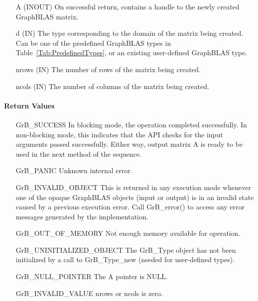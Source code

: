 \begin{itemize}[leftmargin=1.1in]
    \item[{\sf A}] ({\sf INOUT}) On successful return, contains a handle to 
                                 the newly created GraphBLAS matrix.
    \item[{\sf d}] ({\sf IN})    The type corresponding to the domain of the matrix 
                                 being created. Can be one of the predefined
                                 GraphBLAS types in Table~\ref{Tab:PredefinedTypes}, 
                                 or an existing user-defined GraphBLAS type.
    \item[{\sf nrows}] ({\sf IN}) The number of rows of the matrix being created.
    \item[{\sf ncols}] ({\sf IN}) The number of columns of the matrix being created.
\end{itemize}


\paragraph{Return Values}

\begin{itemize}[leftmargin=2.1in]
    \item[{\sf GrB\_SUCCESS}]         In blocking mode, the operation completed
    successfully. In non-blocking mode, this indicates that the API checks 
    for the input arguments passed successfully. Either way, output matrix 
    {\sf A} is ready to be used in the next method of the sequence.

    \item[{\sf GrB\_PANIC}]           Unknown internal error.
    
    \item[{\sf GrB\_INVALID\_OBJECT}] This is returned in any execution mode 
    whenever one of the opaque GraphBLAS objects (input or output) is in an invalid 
    state caused by a previous execution error.  Call {\sf GrB\_error()} to access 
    any error messages generated by the implementation.

    \item[{\sf GrB\_OUT\_OF\_MEMORY}] Not enough memory available for operation.
    
    \item[{\sf GrB\_UNINITIALIZED\_OBJECT}]  The {\sf GrB\_Type} object has not 
    been initialized by a call to {\sf GrB\_Type\_new} (needed for user-defined types).
    
    \item[{\sf GrB\_NULL\_POINTER}]  The {\sf A} pointer is {\sf NULL}.
    
    \item[{\sf GrB\_INVALID\_VALUE}] {\sf nrows} or {\sf ncols} is zero.
\end{itemize}

